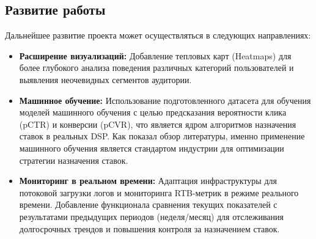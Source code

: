 \subsection{Развитие работы}

Дальнейшее развитие проекта может осуществляться в следующих направлениях:
\begin{itemize}
    \item \textbf{Расширение визуализаций:} Добавление тепловых карт (Heatmaps) для более глубокого анализа поведения различных категорий пользователей и выявления неочевидных сегментов аудитории.
    \item \textbf{Машинное обучение:} Использование подготовленного датасета для обучения моделей машинного обучения с целью предсказания вероятности клика (pCTR) и конверсии (pCVR), что является ядром алгоритмов назначения ставок в реальных DSP. Как показал обзор литературы, именно применение машинного обучения является стандартом индустрии для оптимизации стратегии назначения ставок.
    \item \textbf{Мониторинг в реальном времени:} Адаптация инфраструктуры для потоковой загрузки логов и мониторинга RTB-метрик в режиме реального времени. Добавление функционала сравнения текущих показателей с результатами предыдущих периодов (неделя/месяц) для отслеживания долгосрочных трендов и повышения контроля за назначением ставок.
\end{itemize}

